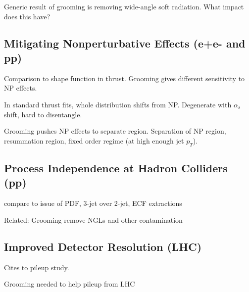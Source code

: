 

Generic result of grooming is removing wide-angle soft radiation.  What impact does this have?

\subsection{Mitigating Nonperturbative Effects (e+e- and pp)}

Comparison to shape function in thrust.  Grooming gives different sensitivity to NP effects.

In standard thrust fits, whole distribution shifts from NP.  Degenerate with $\alpha_s$ shift, hard to disentangle.

Grooming pushes NP effects to separate region.  Separation of NP region, resummation region, fixed order regime (at high enough jet $p_T$).

\subsection{Process Independence at Hadron Colliders (pp)}

compare to issue of PDF, 3-jet over 2-jet, ECF extractions

Related:  Grooming remove NGLs and other contamination


\subsection{Improved Detector Resolution (LHC)}

Cites to pileup study.

Grooming needed to help pileup from LHC
